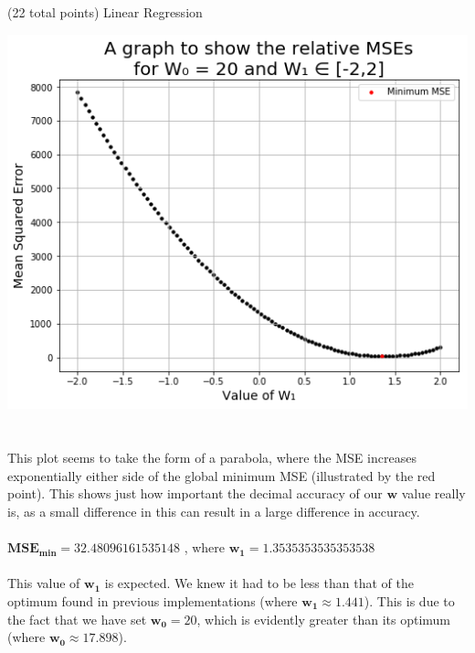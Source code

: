 \documentclass[12pt]{article}
\begin{document}
\begin{question}{(22 total points) Linear Regression}
\begin{subquestion}
\begin{answerbox}{48em}
\includegraphics [width=1\textwidth]{images/q1g-graph.png}\\
\\
\\
This plot seems to take the form of a parabola, where the MSE increases exponentially either side of the global minimum MSE (illustrated by the red point). This shows just how important the decimal accuracy of our $\mathbf{w}$ value really is, as a small difference in this can result in a large difference in accuracy.\\
\\
$\mathbf{MSE_{min}} = 32.48096161535148$ ,  where $\mathbf{w_1} = 1.3535353535353538$\\
\\
This value of $\mathbf{w_1}$ is expected. We knew it had to be less than that of the optimum found in previous implementations (where $\mathbf{w_1} \approx 1.441$). This is due to the fact that we have set $\mathbf{w_0} = 20$, which is evidently greater than its optimum (where $\mathbf{w_0} \approx 17.898$).
\end{answerbox}



\end{subquestion}


 
\end{question}
\end{document}
